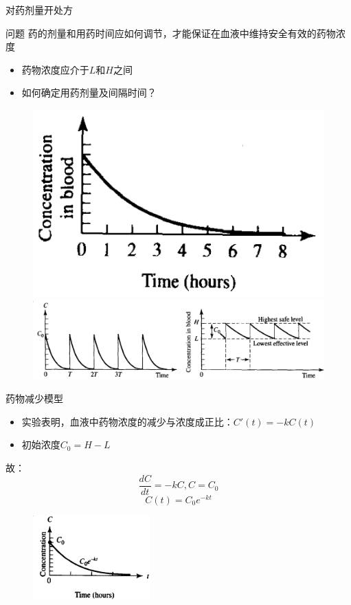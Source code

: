 \documentclass[UTF8]{ctexbeamer}
\begin{document}
\begin{frame}{对药剂量开处方}
  \begin{block}{问题}
    药的剂量和用药时间应如何调节，才能保证在血液中维持安全有效的药物浓度
  \end{block}
  
  \begin{itemize}
  \item 药物浓度应介于$L$和$H$之间
  \item 如何确定用药剂量及间隔时间？
  \end{itemize}
  
  \begin{figure}
    \centering
    \includegraphics[height=0.25\textheight]{dd.png}
    \includegraphics[height=0.25\textheight]{dr.png}
  \end{figure}
  
\end{frame}

\begin{frame}{药物减少模型}
  \begin{itemize}
  \item 实验表明，血液中药物浓度的减少与浓度成正比：$C'(t) = -kC(t)$
  \item 初始浓度$C_0 = H-L$
  \end{itemize}
  故：
  \[
  \frac{dC}{dt} = -kC, C=C_0
  \]
  \[
  C(t) = C_0e^{-kt}
  \]

  \begin{figure}
    \centering
    \includegraphics[width=0.4\textwidth]{dc.png}
  \end{figure}

\end{frame}
\end{document}
